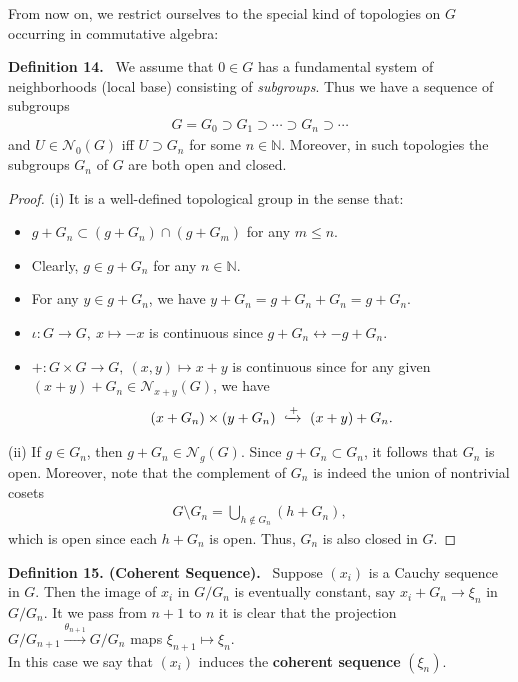 \documentclass[12pt,a4paper,footinclude=true,headinclude=true]{scrbook} %
\newenvironment{definition}[2][Definition]
    { \begin{mdframed}[backgroundcolor=gray!20] \textbf{#1 #2.}\ }
    {  \end{mdframed}}
\begin{document}
\newpage
From now on, we restrict ourselves to the special kind of topologies on $G$ occurring in commutative algebra:
\begin{definition}{14}
    We assume that $0\in G$ has a fundamental system of neighborhoods (local base) consisting of \textit{subgroups}. Thus we have a sequence of subgroups
    \begin{align*}
        G=G_0\supset G_1\supset\cdots\supset G_n\supset\cdots
    \end{align*}
    and $U\in\mathcal{N}_0(G)$ iff $U\supset G_n$ for some $n\in\mathbb{N}$. Moreover, in such topologies the subgroups $G_n$ of $G$ are both open and closed.
\end{definition}
\begin{proof}
    (i) It is a well-defined topological group in the sense that:
    \begin{itemize}
        \item $g+G_n\subset (g+G_n)\cap(g+G_m)$ for any $m\leq n$.
        \item Clearly, $g\in g+G_n$ for any $n\in\mathbb{N}$.
        \item For any $y\in g+G_n$, we have $y+G_n=g+G_n+G_n=g+G_n$.
        \item $\iota:G\to G,\ x\mapsto-x$ is continuous since $g+G_n\leftrightarrow-g+G_n$.
        \item $+:G\times G\to G,\ (x,y)\mapsto x+y$ is continuous since for any given $(x+y)+G_n\in\mathcal{N}_{x+y}(G)$, we have
        \begin{align*}
            (x+G_n)\times(y+G_n)\ \xhookrightarrow{+}\ (x+y)+G_n.
        \end{align*}
    \end{itemize}
    (ii) If $g\in G_n$, then $g+G_n\in\mathcal{N}_g(G)$. Since $g+G_n\subset G_n$, it follows that $G_n$ is open. Moreover, note that the complement of $G_n$ is indeed the union of nontrivial cosets
    \begin{align*}
        G\setminus G_n=\bigcup_{h\notin G_n}(h+G_n),
    \end{align*}
     which is open since each $h+G_n$ is open. Thus, $G_n$ is also closed in $G$.
\end{proof}

\begin{definition}{15. (Coherent Sequence)}
    Suppose $(x_i)$ is a Cauchy sequence in $G$. Then the image of $x_i$ in $G/G_n$ is eventually constant, say $x_i+G_n\longrightarrow\xi_n$ in $G/G_n$. It we pass from $n+1$ to $n$ it is clear that the projection $G/G_{n+1}\xrightarrow{\theta_{n+1}} G/G_n$ maps $\xi_{n+1}\mapsto\xi_n$.\\ In this case we say that $(x_i)$ induces the \textbf{coherent sequence} $(\xi_n)$.
\end{definition}
\end{document}
